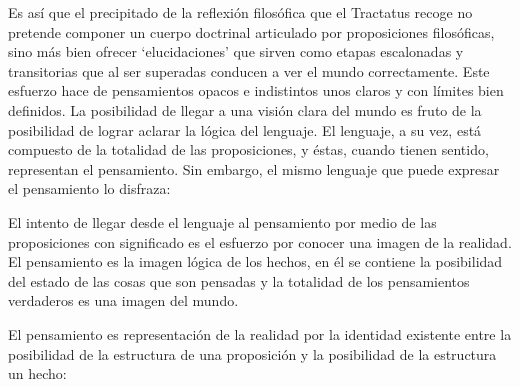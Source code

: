 Es así que el precipitado de la reflexión filosófica que el Tractatus recoge no
pretende componer un cuerpo doctrinal articulado por proposiciones filosóficas,
sino más bien ofrecer `elucidaciones' que sirven como etapas escalonadas y
transitorias que al ser superadas conducen a ver el mundo correctamente. Este
esfuerzo hace de pensamientos opacos e indistintos unos claros y con límites
bien definidos.\autocite[cf. 4.112 y 6.54]{tractatus} 
La posibilidad de llegar a una visión clara del mundo es fruto de la posibilidad
de lograr aclarar la lógica del lenguaje. El lenguaje, a su vez, está compuesto
de la totalidad de las proposiciones, y éstas, cuando tienen sentido,
representan el pensamiento.\autocite[cf. 4 y 4.001]{tractatus} 
Sin embargo, el mismo lenguaje que puede expresar el pensamiento lo disfraza:


El intento de llegar desde el lenguaje al pensamiento por medio de las
proposiciones con significado es el esfuerzo por conocer una imagen de la
realidad. El pensamiento es la imagen lógica de los hechos, en él se contiene la
posibilidad del estado de las cosas que son pensadas y la totalidad de los
pensamientos verdaderos es una imagen del mundo.\autocite[cf.][3 y
3.001]{tractatus}


El pensamiento es representación de la realidad por la identidad existente entre
la posibilidad de la estructura de una proposición y la posibilidad de la
estructura un hecho:


